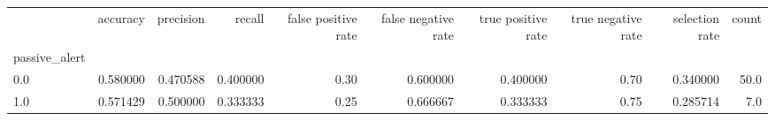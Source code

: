 \begin{tabular}{lrrrrrrrrr}
\toprule
{} &  accuracy &  precision &    recall &  false positive rate &  false negative rate &  true positive rate &  true negative rate &  selection rate &  count \\
passive\_alert &           &            &           &                      &                      &                     &                     &                 &        \\
\midrule
0.0           &  0.580000 &   0.470588 &  0.400000 &                 0.30 &             0.600000 &            0.400000 &                0.70 &        0.340000 &   50.0 \\
1.0           &  0.571429 &   0.500000 &  0.333333 &                 0.25 &             0.666667 &            0.333333 &                0.75 &        0.285714 &    7.0 \\
\bottomrule
\end{tabular}
